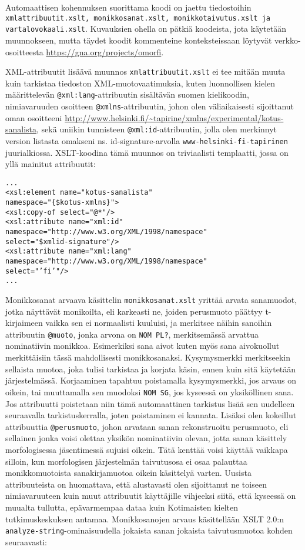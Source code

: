 \documentclass[free]{flammie}
\begin{document}
Automaattisen kohennuksen suorittama koodi on jaettu tiedostoihin
\texttt{xmlattribuutit.xslt, monikkosanat.xslt, monikkotaivutus.xslt ja
vartalovokaali.xslt}.  Kuvauksien ohella on pätkiä koodeista, jota käytetään
muunnokseen, mutta täydet koodit kommenteine konteksteissaan löytyvät
verkko-osoitteesta \url{https://gna.org/projects/omorfi}.

XML-attribuutit lisäävä muunnos \texttt{xmlattribuutit.xslt} ei tee mitään muuta
kuin tarkistaa tiedoston XML-muotovaatimuksia, kuten luonnollisen kielen
määrittelevän \texttt{@xml:lang}-attribuutin sisältävän suomen kielikoodin,
nimiavaruuden osoitteen \texttt{@xmlns}-attribuutin, johon olen väliaikaisesti
sijoittanut oman osoitteeni
\url{http://www.helsinki.fi/~tapirine/xmlns/experimental/kotus-sanalista}, sekä
uniikin tunnisteen \texttt{@xml:id}-attribuutin, jolla olen merkinnyt version listasta omakseni ns. id-signature-arvolla
\texttt{www-helsinki-fi-tapirinen} juurialkiossa. XSLT-koodina tämä muunnos on triviaalisti templaatti, jossa on yllä mainitut attribuutit:
\begin{verbatim}
...
<xsl:element name="kotus-sanalista"
namespace="{$kotus-xmlns}">
<xsl:copy-of select="@*"/>
<xsl:attribute name="xml:id"
namespace="http://www.w3.org/XML/1998/namespace"
select="$xmlid-signature"/>
<xsl:attribute name="xml:lang"
namespace="http://www.w3.org/XML/1998/namespace"
select="’fi’"/>
...
\end{verbatim}

Monikkosanat arvaava käsittelin \texttt{monikkosanat.xslt} yrittää arvata sanamuodot,
jotka näyttävät monikoilta, eli karkeasti ne, joiden perusmuoto päättyy
t-kirjaimeen vaikka sen ei normaalisti kuuluisi, ja merkitsee näihin sanoihin
attribuutin \texttt{@muoto}, jonka arvona on \texttt{NOM PL?}, merkitsemässä arvattua nominatiivin
monikkoa. Esimerkiksi sana aivot kuten myös sana aivokuollut merkittäisiin tässä
mahdollisesti monikkosanaksi. Kysymysmerkki merkitseekin sellaista muotoa, joka
tulisi tarkistaa ja korjata käsin, ennen kuin sitä käytetään järjestelmässä.
Korjaaminen tapahtuu poistamalla kysymysmerkki, jos arvaus on oikein, tai
muuttamalla sen muodoksi \texttt{NOM SG}, jos kyseessä on yksiköllinen sana. Jos
attribuutti poistetaan niin tämä automaattinen tarkistus lisää sen uudelleen
seuraavalla tarkistuskerralla, joten poistaminen ei kannata. Lisäksi olen
kokeillut attribuuttia \texttt{@perusmuoto}, johon arvataan sanan rekonstruoitu
perusmuoto, eli sellainen jonka voisi olettaa yksikön nominatiivin olevan, jotta
sanan käsittely morfologisessa jäsentimessä sujuisi oikein. Tätä kenttää voisi
käyttää vaikkapa silloin, kun morfologisen järjestelmän taivutusosa ei osaa
palauttaa monikkomuotoista sanakirjamuotoa oikein käsittelyä varten. Uusista
attribuuteista on huomattava, että alustavasti olen sijoittanut ne toiseen
nimiavaruuteen kuin muut attribuutit käyttäjille vihjeeksi siitä, että kyseessä
on muualta tullutta, epävarmempaa dataa kuin Kotimaisten kielten
tutkimuskeskuksen antamaa. Monikkosanojen arvaus käsittellään XSLT 2.0:n
\texttt{analyze-string}-ominaisuudella jokaista sanan jokaista taivutusmuotoa kohden
seuraavasti:
\end{document}

